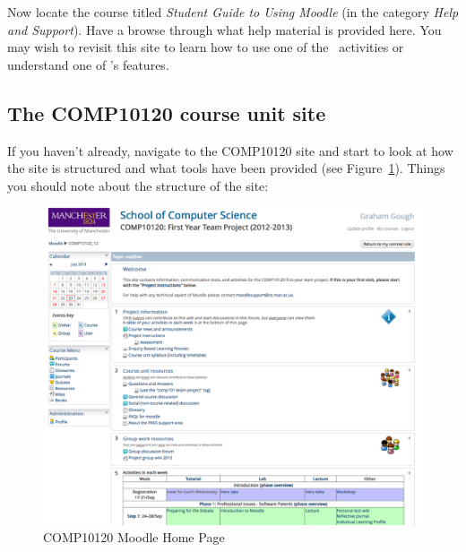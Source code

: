 Now locate the course titled \emph{Student Guide to Using Moodle} (in the category \emph{Help and Support}). Have a browse through what help material is provided here. You may wish to revisit this site to learn how to use one of the \moodle\ activities or understand one of \Moodle's features.

\subsection{The COMP10120 course unit site}
\label{sec:comp10120-course-uni}


If you haven't already, navigate to the COMP10120 site and start to look at how the site is structured and what tools have been provided (see Figure~\ref{figure:101-moodle-page}).
Things you should note about the structure of the site:

\begin{figure}
\centerline{\includegraphics[width=15cm]{images/101-moodle-page}}
\caption{COMP10120 Moodle Home Page}\label{figure:101-moodle-page}
\end{figure}


